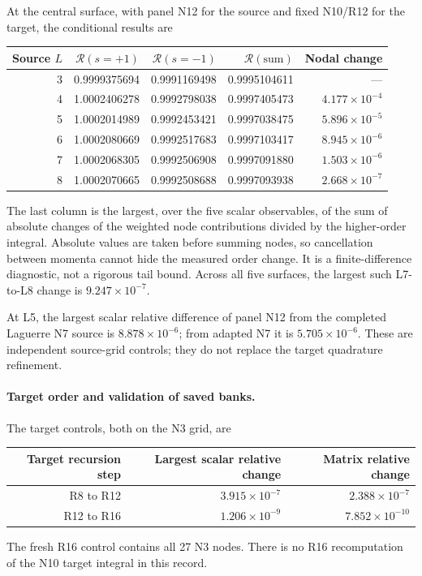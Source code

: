 At the central surface, with panel N12 for the source and
fixed N10/R12 for the target, the conditional results are
\begin{center}
\begin{tabular}{rrrrr}
\toprule
Source $L$ & $\mathcal R(s=+1)$ & $\mathcal R(s=-1)$ & $\mathcal R(\text{sum})$
 & Nodal change\\
\midrule
3 & 0.9999375694 & 0.9991169498 & 0.9995104611 & ---\\
4 & 1.0002406278 & 0.9992798038 & 0.9997405473 & $4.177\times10^{-4}$\\
5 & 1.0002014989 & 0.9992453421 & 0.9997038475 & $5.896\times10^{-5}$\\
6 & 1.0002080669 & 0.9992517683 & 0.9997103417 & $8.945\times10^{-6}$\\
7 & 1.0002068305 & 0.9992506908 & 0.9997091880 & $1.503\times10^{-6}$\\
8 & 1.0002070665 & 0.9992508688 & 0.9997093938 & $2.668\times10^{-7}$\\
\bottomrule
\end{tabular}
\end{center}
The last column is the largest, over the five scalar
observables, of the sum of absolute changes of the weighted
node contributions divided by the higher-order integral.
Absolute values are taken before summing nodes, so cancellation
between momenta cannot hide the measured order change. It is
a finite-difference diagnostic, not a rigorous tail bound.
Across all five surfaces, the largest such L7-to-L8 change
is $9.247\times10^{-7}$.

At L5, the largest scalar relative difference of panel N12
from the completed Laguerre N7 source is $8.878\times10^{-6}$;
from adapted N7 it is $5.705\times10^{-6}$.
These are independent source-grid controls; they do not replace
the target quadrature refinement.

\paragraph{Target order and validation of saved banks.}
The target controls, both on the N3 grid, are
\begin{center}
\begin{tabular}{rrr}
\toprule
Target recursion step & Largest scalar relative change & Matrix relative change\\
\midrule
R8 to R12 & $3.915\times10^{-7}$ & $2.388\times10^{-7}$\\
R12 to R16 & $1.206\times10^{-9}$ & $7.852\times10^{-10}$\\
\bottomrule
\end{tabular}
\end{center}
The fresh R16 control contains all 27 N3 nodes. There is no
R16 recomputation of the N10 target integral in this record.

